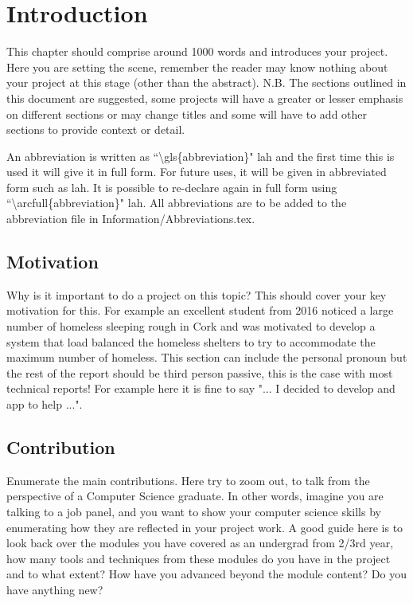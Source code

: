 \chapter{Introduction}
\label{chap:intro}
This chapter should comprise around 1000 words and introduces your project. Here you are setting the scene, remember the reader may know nothing about your project at this stage (other than the abstract). N.B. The sections outlined in this document are suggested, some projects will have a greater or lesser emphasis on different sections or may change titles and some will have to add other sections to provide context or detail.

An abbreviation is written as ``\textbackslash gls\{abbreviation\}" \gls{lah} and the first time this is used it will give it in full form. For future uses, it will be given in abbreviated form such as \gls{lah}. It is possible to re-declare again in full form using ``\textbackslash arcfull\{abbreviation\}" \acrfull{lah}. All abbreviations are to be added to the abbreviation file in Information/Abbreviations.tex.

\section{Motivation}
Why is it important to do a project on this topic? This should cover your key motivation for this. For example an excellent student from 2016 noticed a large number of homeless sleeping rough in Cork and was motivated to develop a system that load balanced the homeless shelters to try to accommodate the maximum number of homeless. This section can include the personal pronoun but the rest of the report should be third person passive, this is the case with most technical reports! For example here it is fine to say "... I decided to develop and app to help ...".

\section{Contribution}
Enumerate the main contributions. Here try to zoom out, to talk from the perspective of a Computer Science graduate. In other words, imagine you are talking to a job panel, and you want to show your computer science skills by enumerating how they are reflected in your project work. A good guide here is to look back over the modules you have covered as an undergrad from 2/3rd year, how many tools and techniques from these modules do you have in the project and to what extent? How have you advanced beyond the module content? Do you have anything new?

